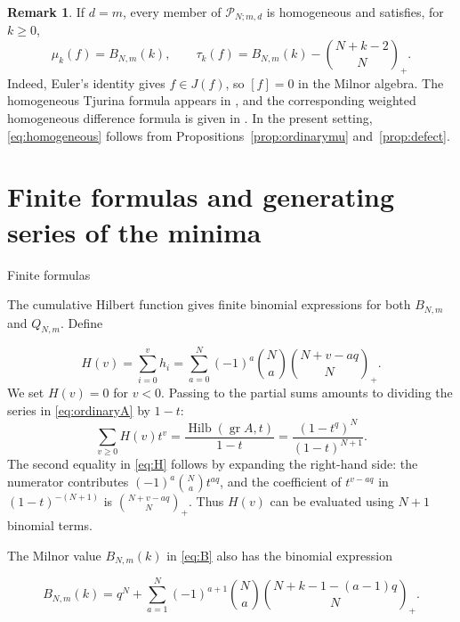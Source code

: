 \documentclass[12pt,reqno]{amsart}
\makeatletter
\renewcommand\subsection{\@startsection{subsection}{2}%
  \z@{.8\linespacing\@plus.3\linespacing}{.35\linespacing}%
  {\normalfont\bfseries}}
\newcommand{\gr}{\operatorname{gr}}
\newcommand{\Hilb}{\operatorname{Hilb}}
\newcommand{\tbin}[2]{\binom{#1}{#2}_{\!+}}
\newcommand{\Pclass}{\mathcal P_{N;m,d}}
\theoremstyle{definition}
\newtheorem{remark}[theorem]{Remark}
\makeatother
\begin{document}
 


\begin{remark}\label{rem:homogeneous}
If $d=m$, every member of $\Pclass$ is homogeneous and satisfies,
for $k\geq0$,
\begin{equation}\label{eq:homogeneous}
\mu_k(f)=B_{N,m}(k),\qquad \tau_k(f)=B_{N,m}(k)-\tbin{N+k-2}{N}.
\end{equation}
Indeed, Euler's identity gives $f\in J(f)$, so $[f]=0$ in the Milnor algebra.
The homogeneous Tjurina formula appears in
\cite[Corollary~4]{HYZHomogeneous}, and the corresponding
weighted homogeneous difference formula is given in
\cite[Proposition~2.6]{HLYZ}. In the present setting,
\eqref{eq:homogeneous} follows from Propositions~\ref{prop:ordinarymu}
and~\ref{prop:defect}.


\end{remark}

 


\section{Finite formulas and generating series of the minima}
\label{sec:explicit}
 
\subsection{Finite formulas}
 
The cumulative Hilbert function gives finite binomial expressions
for both $B_{N,m}$ and $Q_{N,m}$. Define

\begin{equation}\label{eq:H}
 H(v)=\sum_{i=0}^{v}h_i
     =\sum_{a=0}^{N}(-1)^a\binom Na\tbin{N+v-aq}{N}.
\end{equation}
We set $H(v)=0$ for $v<0$. Passing to the partial sums
amounts to dividing the series in \eqref{eq:ordinaryA} by $1-t$:
\[
 \sum_{v\geq0}H(v)t^v=\frac{\Hilb(\gr A,t)}{1-t}
       =\frac{(1-t^q)^N}{(1-t)^{N+1}}.
\]
The second equality in \eqref{eq:H} follows by expanding
the right-hand side: the numerator contributes
$(-1)^a\binom Na t^{aq}$,
and the coefficient of $t^{v-aq}$ in $(1-t)^{-(N+1)}$
is $\tbin{N+v-aq}{N}$. Thus $H(v)$ can be evaluated using
$N+1$ binomial terms.

The Milnor value $B_{N,m}(k)$ in \eqref{eq:B} also has the binomial
expression \cite[equation~(4.3)]{LiuYauZhang2026}

\begin{equation}\label{eq:Balternating}
 B_{N,m}(k)=q^N+\sum_{a=1}^{N}(-1)^{a+1}\binom Na
                    \tbin{N+k-1-(a-1)q}{N}.
\end{equation}
\end{document}
